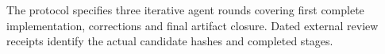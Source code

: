 The protocol specifies three iterative agent rounds covering first complete implementation, corrections and final artifact closure. Dated external review receipts identify the actual candidate hashes and completed stages.
